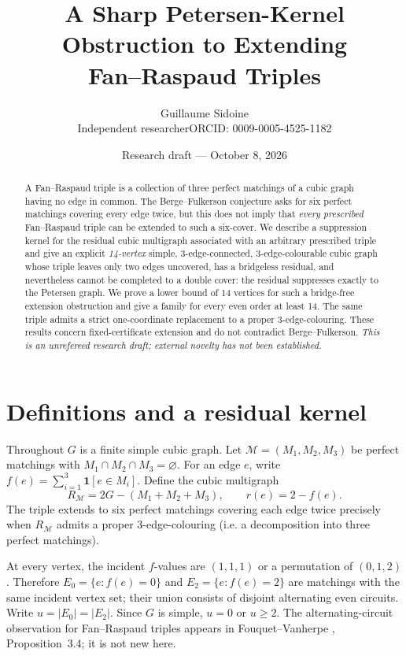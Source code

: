\documentclass[11pt]{article}
\title{A Sharp Petersen-Kernel Obstruction to Extending\\Fan--Raspaud Triples}
\author{Guillaume Sidoine\\\small Independent researcher\quad ORCID: 0009-0005-4525-1182}
\date{Research draft --- October 8, 2026}
\newcommand{\PM}{\mathcal M}
\begin{document}
\maketitle
\begin{abstract}
A Fan--Raspaud triple is a collection of three perfect matchings of a cubic graph having no edge in common. The Berge--Fulkerson conjecture asks for six perfect matchings covering every edge twice, but this does not imply that \emph{every prescribed} Fan--Raspaud triple can be extended to such a six-cover. We describe a suppression kernel for the residual cubic multigraph associated with an arbitrary prescribed triple and give an explicit \emph{14-vertex} simple, $3$-edge-connected, $3$-edge-colourable cubic graph whose triple leaves only two edges uncovered, has a bridgeless residual, and nevertheless cannot be completed to a double cover: the residual suppresses exactly to the Petersen graph. We prove a lower bound of 14 vertices for such a bridge-free extension obstruction and give a family for every even order at least 14. The same triple admits a strict one-coordinate replacement to a proper $3$-edge-colouring. These results concern fixed-certificate extension and do not contradict Berge--Fulkerson. \emph{This is an unrefereed research draft; external novelty has not been established.}
\end{abstract}

\section{Definitions and a residual kernel}
Throughout $G$ is a finite simple cubic graph. Let $\PM=(M_1,M_2,M_3)$ be perfect matchings with $M_1\cap M_2\cap M_3=\varnothing$. For an edge $e$, write $f(e)=\sum_{i=1}^3\mathbf 1[e\in M_i]$. Define the cubic multigraph
\[
R_{\PM}=2G-(M_1+M_2+M_3),\qquad r(e)=2-f(e).
\]
The triple extends to six perfect matchings covering each edge twice precisely when $R_{\PM}$ admits a proper $3$-edge-colouring (i.e. a decomposition into three perfect matchings).

At every vertex, the incident $f$-values are $(1,1,1)$ or a permutation of $(0,1,2)$. Therefore $E_0=\{e:f(e)=0\}$ and $E_2=\{e:f(e)=2\}$ are matchings with the same incident vertex set; their union consists of disjoint alternating even circuits. Write $u=|E_0|=|E_2|$. Since $G$ is simple, $u=0$ or $u\ge2$. The alternating-circuit observation for Fan--Raspaud triples appears in Fouquet--Vanherpe \cite{FV09}, Proposition~3.4; it is not new here.
\end{document}
